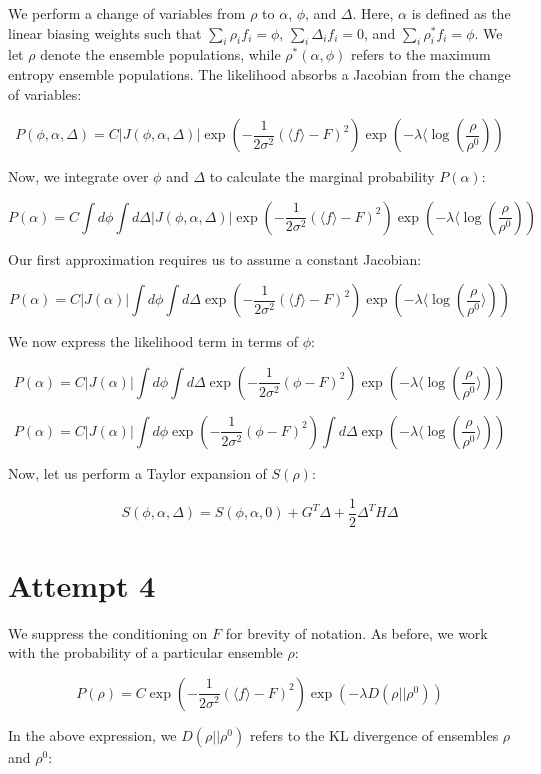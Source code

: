 \documentclass[12pt]{article}
\begin{document}
We perform a change of variables from $\rho$ to $\alpha$, $\phi$, and $\Delta$.  Here, $\alpha$ is defined as the linear biasing weights such that $\sum_i \rho_i f_i = \phi$, $\sum_i \Delta_i f_i = 0$, and $\sum_i \rho_i^* f_i = \phi$.  We let $\rho$ denote the ensemble populations, while $\rho^*(\alpha, \phi)$ refers to the maximum entropy ensemble populations.  The likelihood absorbs a Jacobian from the change of variables:

$$P(\phi, \alpha, \Delta) = C |J(\phi, \alpha, \Delta)| \exp(-\frac{1}{2\sigma^2} (\langle f \rangle - F)^2) \exp(-\lambda \langle \log(\frac{\rho}{\rho^0}))$$

Now, we integrate over $\phi$ and $\Delta$ to calculate the marginal probability $P(\alpha)$:

$$P(\alpha) = C \int d\phi \int d\Delta |J(\phi, \alpha, \Delta)| \exp(-\frac{1}{2\sigma^2} (\langle f \rangle - F)^2) \exp(-\lambda \langle \log(\frac{\rho}{\rho^0}))$$

Our first approximation requires us to assume a constant Jacobian:

$$P(\alpha) = C |J(\alpha)| \int d\phi \int d\Delta  \exp(-\frac{1}{2\sigma^2} (\langle f \rangle - F)^2) \exp(-\lambda \langle \log(\frac{\rho}{\rho^0}\rangle))$$

We now express the likelihood term in terms of $\phi$:

$$P(\alpha) = C |J(\alpha)| \int d\phi \int d\Delta  \exp(-\frac{1}{2\sigma^2} (\phi - F)^2) \exp(-\lambda \langle \log(\frac{\rho}{\rho^0}\rangle))$$

$$P(\alpha) = C |J(\alpha)| \int d\phi \exp(-\frac{1}{2\sigma^2} (\phi - F)^2) \int d\Delta   \exp(-\lambda \langle \log(\frac{\rho}{\rho^0}\rangle))$$

Now, let us perform a Taylor expansion of $S(\rho)$:

$$S(\phi, \alpha, \Delta) = S(\phi, \alpha, 0) + G^T \Delta + \frac{1}{2} \Delta^T H \Delta$$

\section*{Attempt 4}

We suppress the conditioning on $F$ for brevity of notation.  As before, we work with the probability of a particular ensemble $\rho$:

$$P(\rho) = C \exp(-\frac{1}{2\sigma^2} (\langle f \rangle - F)^2) \exp(-\lambda D(\rho || \rho^0))$$

In the above expression, we $D(\rho || \rho^0)$ refers to the KL divergence of ensembles $\rho$ and $\rho^0$:
\end{document}
